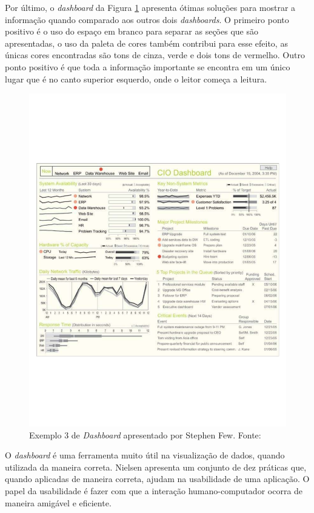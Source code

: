 Por último, o \textit{dashboard} da Figura \ref{img:dashboard3} apresenta ótimas soluções para mostrar a informação quando comparado aos outros dois \textit{dashboards}. O primeiro ponto positivo é o uso do espaço em branco para separar as seções que são apresentadas, o uso da paleta de cores também contribui para esse efeito, as únicas cores encontradas são tons de cinza, verde e dois tons de vermelho. Outro ponto positivo é que toda a informação importante se encontra em um único lugar que é no canto superior esquerdo, onde o leitor começa a leitura.
\graphicspath{{figuras/}}
\begin{figure}[h!]
\centering
\includegraphics[scale=0.60]{dashboard3}
\caption{Exemplo 3 de \textit{Dashboard} apresentado por Stephen Few. Fonte: \cite{book_design}}
\label{img:dashboard3}
\end{figure}

O \textit{dashboard} é uma ferramenta muito útil na visualização de dados, quando utilizada da maneira correta. Nielsen apresenta um conjunto de dez práticas que, quando aplicadas de maneira correta, ajudam  na usabilidade de uma aplicação. O papel da       usabilidade é fazer com que a interação humano-computador ocorra de maneira amigável e eficiente.

